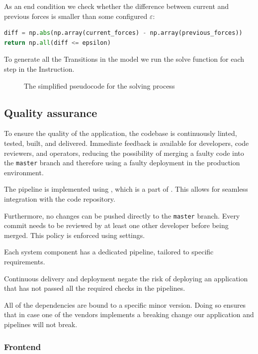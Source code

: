 As an end condition we check whether the difference between current and previous forces is smaller than some configured $\varepsilon$:

\begin{lstlisting}[language=Python]
diff = np.abs(np.array(current_forces) - np.array(previous_forces))
return np.all(diff <= epsilon)
\end{lstlisting}

To generate all the Transitions in the model we run the solve function for each step in the Instruction.

\begin{figure}[H]
	\caption{The simplified pseudocode for the solving process}
	
\end{figure}


\subsection{Quality assurance}

To ensure the quality of the application, the codebase is continuously linted, tested, built, and delivered. Immediate feedback is available for developers, code reviewers, and operators, reducing the possibility of merging a faulty code into the \texttt{master} branch and therefore using a faulty deployment in the production environment.

\medskip
The pipeline is implemented using , which is a part of . This allows for seamless integration with the code repository.

\medskip
Furthermore, no changes can be pushed directly to the \texttt{master} branch. Every commit needs to be reviewed by at least one other developer before being merged. This policy is enforced using  settings.

\medskip
Each system component has a dedicated pipeline, tailored to specific requirements. 

\medskip
Continuous delivery and deployment negate the risk of deploying an application that has not passed all the required checks in the pipelines.

\medskip
All of the dependencies are bound to a specific minor version. Doing so ensures that in case one of the vendors implements a breaking change our application and pipelines will not break.

\subsubsection{Frontend}

